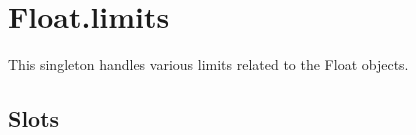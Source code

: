 
\section{Float.limits}
\label{sec:float-limits}

This singleton handles various limits related to the Float objects.

\subsection{Slots}

